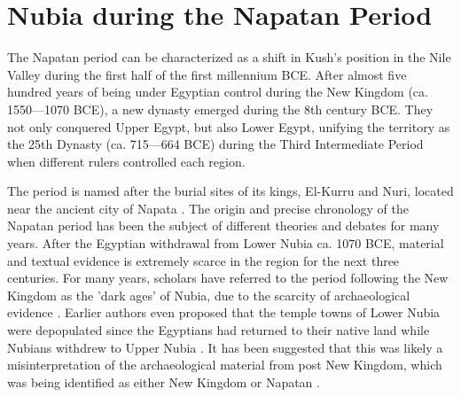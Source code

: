 \section{Nubia during the Napatan Period}

The Napatan period can be characterized as a shift in Kush’s position in the Nile Valley during the first half of the first millennium BCE. After almost five hundred years of being under Egyptian control during the New Kingdom (ca. 1550—1070 BCE), a new dynasty emerged during the 8th century BCE. They not only conquered Upper Egypt, but also Lower Egypt, unifying the territory as the 25th Dynasty (ca. 715—664 BCE) during the Third Intermediate Period when different rulers controlled each region.

The period is named after the burial sites of its kings, El-Kurru and Nuri, located near the ancient city of Napata \parencite[p.~1]{popeNapatanPeriod2020}. The origin and precise chronology of the Napatan period has been the subject of different theories and debates for many years. After the Egyptian withdrawal from Lower Nubia ca. 1070 BCE, material and textual evidence is extremely scarce in the region for the next three centuries. For many years, scholars have referred to the period following the New Kingdom as the 'dark ages' of Nubia, due to the scarcity of archaeological evidence \parencites[p.~250]{adamsNubiaCorridorAfrica1977}[pp.~88, 109-110]{torokKingdomKushHandbook1997}[p.~129]{morkotBlackPharaohsEgypts2000}[pp.~412-413]{williamsNapatanNeoKushiteState2020}. Earlier authors even proposed that the temple towns of Lower Nubia were depopulated since the Egyptians had returned to their native land while Nubians withdrew to Upper Nubia \parencites[p.~108-109]{adamsPostPharaonicNubiaLight1964}{firthArchaeologicalReportNubia1912}[p.109]{edwardsNubianArchaeologySudan2004}. It has been suggested that this was likely a misinterpretation of the archaeological material from post New Kingdom, which was being identified as either New Kingdom or Napatan \parencites[p.~108-109]{adamsPostPharaonicNubiaLight1964}{firthArchaeologicalReportNubia1912}[p.~109]{edwardsNubianArchaeologySudan2004}.

